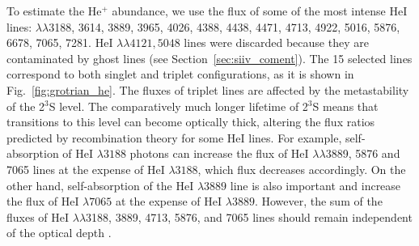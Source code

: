\documentclass[fleqn,usenatbib]{mnras}
\begin{document}
To estimate the He$^{+}$ abundance, we use the flux of some of the most intense He\thinspace I lines: $\lambda \lambda$3188, 3614, 3889, 3965, 4026, 4388, 4438, 4471, 4713, 4922, 5016, 5876, 6678, 7065, 7281. He\thinspace I $\lambda \lambda 4121,5048$ lines were discarded because they are contaminated by ghost lines (see Section~\ref{sec:siiv_coment}). The 15 selected lines correspond to both singlet and triplet configurations, as it is shown in Fig.~\ref{fig:grotrian_he}. The fluxes of triplet lines are affected by the metastability of the 2$^{3}$S level. The comparatively much longer lifetime of 2$^{3}$S means that transitions to this level can become optically thick, altering the flux ratios predicted by recombination theory for some He\thinspace I lines. For example, self-absorption of He\thinspace I $\lambda 3188$ photons can increase the flux of He\thinspace I $\lambda \lambda $3889, 5876 and 7065 lines at the expense of He\thinspace I $\lambda 3188$, which flux decreases accordingly. On the other hand, self-absorption of the He\thinspace I $\lambda 3889$ line is also important and increase the flux of He\thinspace I $\lambda 7065$ at the expense of He\thinspace I $\lambda 3889$. However, the sum of the fluxes of He\thinspace I $\lambda \lambda $3188, 3889, 4713, 5876, and 7065 
lines should remain independent of the optical depth \citep[parameterized by $\tau _{3889}$ or $\tau_{3188}$,][]{Porter07}.
\end{document}
